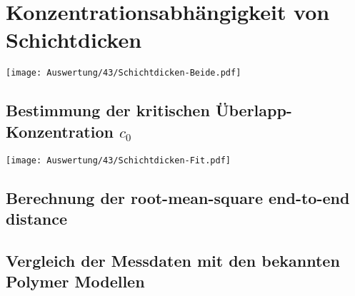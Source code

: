 
\newpage
\section{Konzentrationsabhängigkeit von Schichtdicken}
\label{sec:konzDicke}

\begin{center}
	\captionsetup{type=figure}
	\texttt{[image: Auswertung/43/Schichtdicken-Beide.pdf]}
	\label{fig:fitgueteReflexion}
\end{center}


\newpage
\subsection{Bestimmung der kritischen Überlapp-Konzentration $c_0$}

\begin{center}
	\captionsetup{type=figure}
	\texttt{[image: Auswertung/43/Schichtdicken-Fit.pdf]}
	\label{fig:fitgueteReflexion}
\end{center}


\subsection{Berechnung der root-mean-square end-to-end distance}


\subsection{Vergleich der Messdaten mit den bekannten Polymer Modellen}